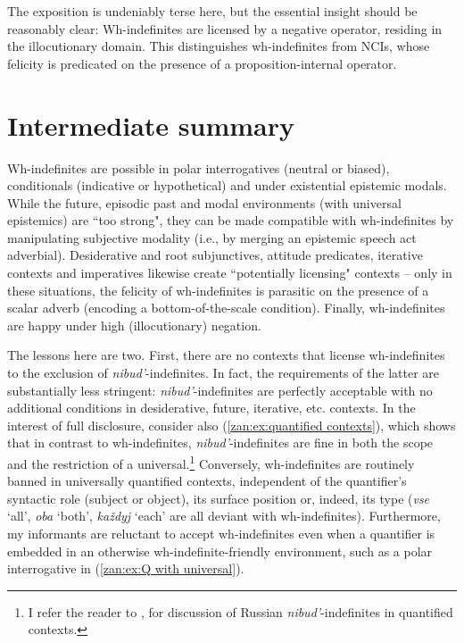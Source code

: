\documentclass[output=paper,colorlinks,citecolor=brown]{langscibook}
\begin{document}

\z
\z

\noindent The exposition is undeniably terse here, but the essential insight should be reasonably clear: Wh-indefinites are licensed by a negative operator, residing in the illocutionary domain. This distinguishes wh-indefinites from NCIs, whose felicity is predicated on the presence of a proposition-internal operator.   


\section{Intermediate summary}\label{zan:subsec:intermediate summary}

Wh-indefinites are possible in polar interrogatives (neutral or biased), conditionals (indicative or hypothetical) and under existential epistemic modals. While the future, episodic past and modal environments (with universal epistemics) are ``too strong", they can be made compatible with wh-indefinites by manipulating subjective modality (i.e., by merging an epistemic speech act adverbial). Desiderative and root subjunctives, attitude predicates, iterative contexts and imperatives likewise create ``potentially licensing" contexts -- only in these situations, the felicity of wh-indefinites is parasitic on the presence of a scalar adverb (encoding a bottom-of-the-scale condition). Finally, wh-indefinites are happy under high (illocutionary) negation. 

The lessons here are two. First, there are no contexts that license wh-indefinites to the exclusion of \textit{nibud'}-indefinites. In fact, the requirements of the latter are substantially less stringent: \textit{nibud'}-indefinites are perfectly acceptable with no additional conditions in desiderative, future, iterative, etc. contexts. In the interest of full disclosure, consider also (\ref{zan:ex:quantified contexts}), which shows that in contrast to wh-indefinites, \textit{nibud'}-indefinites are fine in both the scope and the restriction of a universal.\footnote {I refer the reader to \citet{PaduchevaE.V.ElenaViktorovna1974Oss:}, \citet{pereltsvaig2008} for discussion of Russian \textit{nibud'}-indefinites in quantified contexts.} Conversely, wh-indefinites are routinely banned in universally quantified contexts, independent of the quantifier's syntactic role (subject or object), its surface position or, indeed, its type (\textit{vse} `all', \textit{oba} `both', \textit{každyj} `each' are all deviant with wh-indefinites). Furthermore, my informants are reluctant to accept wh-indefinites even when a quantifier is embedded in an otherwise wh-indefinite-friendly environment, such as a polar interrogative in (\ref{zan:ex:Q with universal}).       
\end{document}
